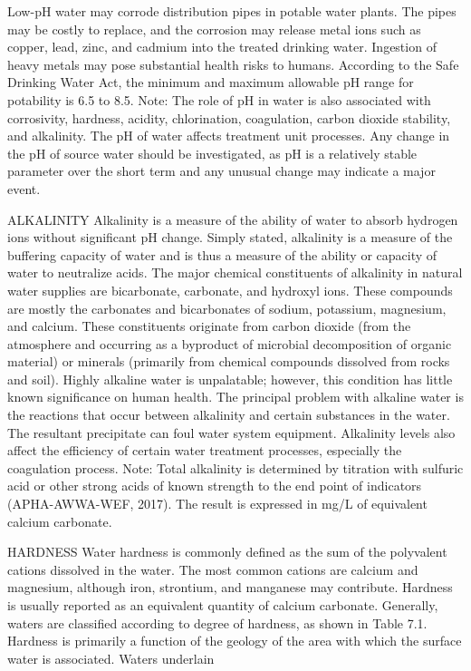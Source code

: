 \documentclass{article}
\begin{document}
Low-pH water may corrode distribution pipes in potable water plants. The
pipes may be costly to replace, and the corrosion may release metal ions
such as copper, lead, zinc, and cadmium into the treated drinking water.
Ingestion of heavy metals may pose substantial health risks to humans.
According to the Safe Drinking Water Act, the minimum and maximum
allowable pH range for potability is 6.5 to 8.5. Note: The role of pH in
water is also associated with corrosivity, hardness, acidity,
chlorination, coagulation, carbon dioxide stability, and alkalinity. The
pH of water affects treatment unit processes. Any change in the pH of
source water should be investigated, as pH is a relatively stable
parameter over the short term and any unusual change may indicate a
major event.

ALKALINITY Alkalinity is a measure of the ability of water to absorb
hydrogen ions without significant pH change. Simply stated, alkalinity
is a measure of the buffering capacity of water and is thus a measure of
the ability or capacity of water to neutralize acids. The major chemical
constituents of alkalinity in natural water supplies are bicarbonate,
carbonate, and hydroxyl ions. These compounds are mostly the carbonates
and bicarbonates of sodium, potassium, magnesium, and calcium. These
constituents originate from carbon dioxide (from the atmosphere and
occurring as a byproduct of microbial decomposition of organic material)
or minerals (primarily from chemical compounds dissolved from rocks and
soil). Highly alkaline water is unpalatable; however, this condition has
little known significance on human health. The principal problem with
alkaline water is the reactions that occur between alkalinity and
certain substances in the water. The resultant precipitate can foul
water system equipment. Alkalinity levels also affect the efficiency of
certain water treatment processes, especially the coagulation process.
Note: Total alkalinity is determined by titration with sulfuric acid or
other strong acids of known strength to the end point of indicators
(APHA-AWWA-WEF, 2017). The result is expressed in mg/L of equivalent
calcium carbonate.

HARDNESS Water hardness is commonly defined as the sum of the polyvalent
cations dissolved in the water. The most common cations are calcium and
magnesium, although iron, strontium, and manganese may contribute.
Hardness is usually reported as an equivalent quantity of calcium
carbonate. Generally, waters are classified according to degree of
hardness, as shown in Table 7.1. Hardness is primarily a function of the
geology of the area with which the surface water is associated. Waters
underlain
\end{document}
